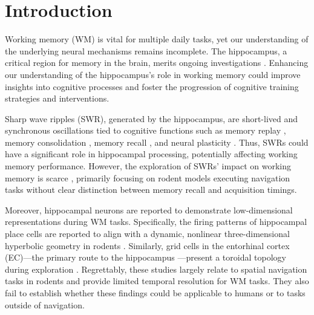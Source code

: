 \documentclass[final,3p,times,twocolumn]{elsarticle}
\begin{document}
\section{Introduction}
Working memory (WM) is vital for multiple daily tasks, yet our understanding of the underlying neural mechanisms remains incomplete. The hippocampus, a critical region for memory in the brain, merits ongoing investigations \cite{scoville_loss_1957,squire_legacy_2009,boran_persistent_2019,kaminski_persistently_2017,kornblith_persistent_2017,faraut_dataset_2018,borders_hippocampus_2022,li_functional_2023,dimakopoulos_information_2022}. Enhancing our understanding of the hippocampus's role in working memory could improve insights into cognitive processes and foster the progression of cognitive training strategies and interventions. 

\indent
Sharp wave ripples (SWR), generated by the hippocampus, are short-lived and synchronous oscillations tied to cognitive functions such as memory replay \cite{wilson_reactivation_1994,nadasdy_replay_1999,lee_memory_2002,davidson_hippocampal_2009}, memory consolidation \cite{girardeau_selective_2009,ego-stengel_disruption_2010,fernandez-ruiz_long-duration_2019,kim_corticalhippocampal_2022}, memory recall \cite{wu_hippocampal_2017,norman_hippocampal_2019,norman_hippocampal_2021}, and neural plasticity \cite{behrens_induction_2005,norimoto_hippocampal_2018}. Thus, SWRs could have a significant role in hippocampal processing, potentially affecting working memory performance. However, the exploration of SWRs' impact on working memory is scarce \cite{jadhav_awake_2012}, primarily focusing on rodent models executing navigation tasks without clear distinction between memory recall and acquisition timings.

\indent
Moreover, hippocampal neurons are reported to demonstrate low-dimensional representations during WM tasks. Specifically, the firing patterns of hippocampal place cells \cite{okeefe_hippocampus_1971,okeefe_place_1976,ekstrom_cellular_2003,kjelstrup_finite_2008,harvey_intracellular_2009,royer_control_2012} are reported to align with a dynamic, nonlinear three-dimensional hyperbolic geometry in rodents \cite{zhang_hippocampal_2022}. Similarly, grid cells in the entorhinal cortex (EC)—the primary route to the hippocampus \cite{naber_reciprocal_2001,van_strien_anatomy_2009,strange_functional_2014}—present a toroidal topology during exploration \cite{gardner_toroidal_2022}. Regrettably, these studies largely relate to spatial navigation tasks in rodents and provide limited temporal resolution for WM tasks. They also fail to establish whether these findings could be applicable to humans or to tasks outside of navigation.
\end{document}
